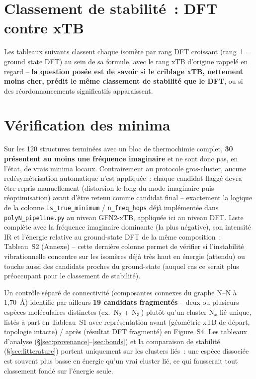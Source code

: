 \documentclass[11pt,a4paper]{article}
\begin{document}
\section{Classement de stabilit\'e~: DFT contre xTB}
\label{sec:ranking}

Les tableaux suivants classent chaque isom\`ere par rang DFT croissant
(rang~1 = ground state DFT) au sein de sa formule, avec le rang xTB
d'origine rappel\'e en regard -- \textbf{la question pos\'ee est de savoir
si le criblage xTB, nettement moins cher, pr\'edit le m\^eme classement de
stabilit\'e que le DFT}, ou si des r\'eordonnancements significatifs
apparaissent.





\section{V\'erification des minima}
\label{sec:minima}

Sur les 120 structures termin\'ees avec un bloc de thermochimie complet,
\textbf{30 pr\'esentent au moins une fr\'equence imaginaire} et ne sont
donc pas, en l'\'etat, de vrais minima locaux. Contrairement au protocole
gros-cluster, aucune red\'esym\'etrisation automatique n'est appliqu\'ee~:
chaque candidat flagg\'e devra \^etre repris manuellement (distorsion le
long du mode imaginaire puis r\'eoptimisation) avant d'\^etre retenu comme
candidat final -- exactement la logique de la colonne
\texttt{is\_true\_minimum} / \texttt{n\_freq\_hops} d\'ej\`a impl\'ement\'ee
dans \texttt{polyN\_pipeline.py} au niveau GFN2-xTB, appliqu\'ee ici au
niveau DFT. Liste compl\`ete avec la fr\'equence imaginaire dominante
(la plus n\'egative), son intensit\'e IR et l'\'energie relative au
ground-state DFT de la m\^eme composition~: Tableau~S2 (Annexe) -- cette
derni\`ere colonne permet de v\'erifier si l'instabilit\'e vibrationnelle
concentre sur les isom\`eres d\'ej\`a tr\`es haut en \'energie (attendu)
ou touche aussi des candidats proches du ground-state (auquel cas ce
serait plus pr\'eoccupant pour le classement de stabilit\'e).

Un contr\^ole s\'epar\'e de connectivit\'e (composantes connexes du
graphe N--N \`a 1,70~\AA) identifie par ailleurs \textbf{19 candidats
fragment\'es} -- deux ou plusieurs esp\`eces mol\'eculaires distinctes
(ex.\ N$_2$ + N$_3^-$) plut\^ot qu'un cluster N$_x$ li\'e unique, list\'es
\`a part en Tableau~S1 avec repr\'esentation avant (g\'eom\'etrie xTB de
d\'epart, topologie intacte) / apr\`es (r\'esultat DFT fragment\'e) en
Figure~S4. Les tableaux d'analyse (\S\ref{sec:provenance}--\ref{sec:bonds})
et la comparaison de stabilit\'e (\S\ref{sec:litterature}) portent
uniquement sur les clusters li\'es~: une esp\`ece dissoci\'ee est souvent
plus basse en \'energie qu'un vrai cluster li\'e, ce qui fausserait tout
classement fond\'e sur l'\'energie seule.
\end{document}

